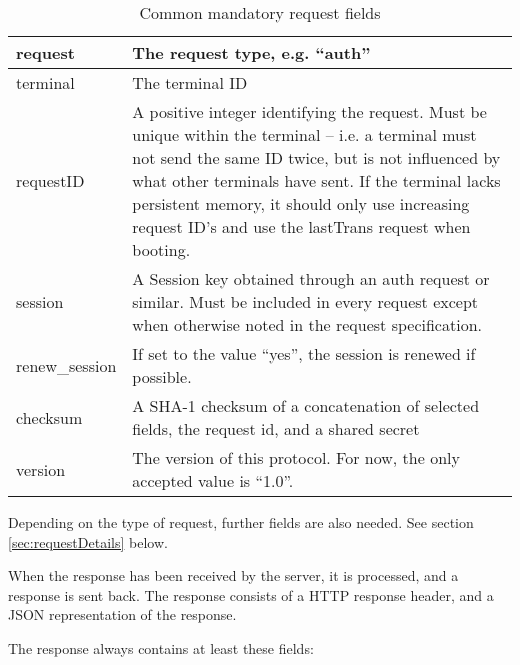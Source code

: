 \documentclass[a4paper,11pt]{article}
\newcommand{\code}[1]
   {\textsf{\mbox{#1}}}
\newcommand{\rightcellwidth}{25em}
\begin{document}
\begin{table}[!ht]
  \begin{tabular}{|l|p{\rightcellwidth}|}
    \hline
    request & The request type, e.g. ``auth'' \\\hline
    terminal & The terminal ID \\\hline
    requestID & A positive integer identifying the request. Must be unique
      within the terminal -- i.e. a terminal must not send the same ID
      twice, but is not influenced by what other terminals have sent. If
      the terminal lacks persistent memory, it should only use
      increasing request ID's and use the \code{lastTrans} request
      when booting.\\\hline 
    session & A Session key obtained through an \code{auth} request or
      similar. Must be included in every request except when otherwise
      noted in the request specification.\\\hline
    renew\_session & If set to the value ``yes'', the session is
      renewed if possible.\\\hline
    checksum & A SHA-1 checksum of a concatenation of selected fields,
      the request id, and a shared secret \\\hline 
    version & The version of this protocol. For now, the only accepted
      value is ``1.0''. \\\hline 
  \end{tabular} 
  \caption{Common mandatory request fields}
\end{table}

Depending on the type of request, further fields are also needed. See
section \ref{sec:requestDetails} below. 


When the response has been received by the server, it is processed,
and a response is sent back. The response consists of a HTTP response
header, and a JSON representation of the response.

The response always contains at least these fields:
\end{document}
